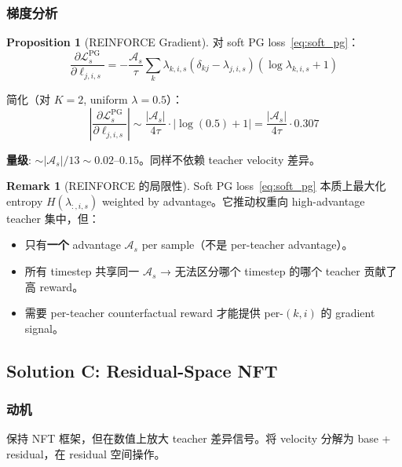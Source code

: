 \documentclass[11pt,a4paper]{article}
\newcommand{\loss}{\mathcal{L}}
\newcommand{\adv}{\mathcal{A}}
\theoremstyle{definition}
\newtheorem{remark}{Remark}
\newtheorem{proposition}{Proposition}
\begin{document}
\subsubsection{梯度分析}

\begin{proposition}[REINFORCE Gradient]
对 soft PG loss~\eqref{eq:soft_pg}：
\begin{equation}
\frac{\partial \loss^{\mathrm{PG}}_s}{\partial \ell_{j,i,s}} = -\frac{\adv_s}{\tau}\sum_k \lambda_{k,i,s}(\delta_{kj} - \lambda_{j,i,s})(\log\lambda_{k,i,s} + 1)
\label{eq:pg_gradient}
\end{equation}

简化（对 $K=2$, uniform $\lambda = 0.5$）：
\begin{equation}
\left|\frac{\partial \loss^{\mathrm{PG}}_s}{\partial \ell_{j,i,s}}\right| \sim \frac{|\adv_s|}{4\tau} \cdot |\log(0.5) + 1| = \frac{|\adv_s|}{4\tau} \cdot 0.307
\end{equation}

\textbf{量级}: $\sim |\adv_s| / 13 \sim 0.02$--$0.15$。同样不依赖 teacher velocity 差异。
\end{proposition}

\begin{remark}[REINFORCE 的局限性]
Soft PG loss~\eqref{eq:soft_pg} 本质上最大化 entropy $H(\lambda_{:,i,s})$ weighted by advantage。它推动权重向 high-advantage teacher 集中，但：
\begin{itemize}[leftmargin=1em]
\item 只有\textbf{一个} advantage $\adv_s$ per sample（不是 per-teacher advantage）。
\item 所有 timestep 共享同一 $\adv_s$ → 无法区分哪个 timestep 的哪个 teacher 贡献了高 reward。
\item 需要 per-teacher counterfactual reward 才能提供 per-$(k,i)$ 的 gradient signal。
\end{itemize}
\end{remark}

\subsection{Solution C: Residual-Space NFT}

\subsubsection{动机}
保持 NFT 框架，但在数值上放大 teacher 差异信号。将 velocity 分解为 base + residual，在 residual 空间操作。
\end{document}

